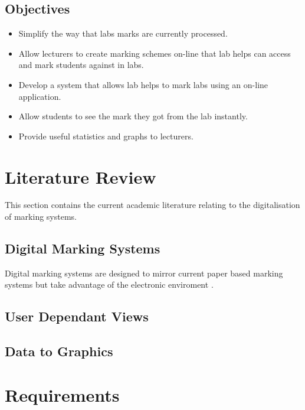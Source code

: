 \documentclass[12pt]{article}  %
\theoremstyle{definition}
\theoremstyle{remark}
\begin{document}
\subsection{Objectives}
\begin{itemize}
\item Simplify the way that labs marks are currently processed.
\item Allow lecturers to create marking schemes on-line that lab helps can access and mark students against in labs.
\item Develop a system that allows lab helps to mark labs using an on-line application.
\item Allow students to see the mark they got from the lab instantly.
\item Provide useful statistics and graphs to lecturers.
\end{itemize}





\newpage
\section{Literature Review}

This section contains the current academic literature relating to the digitalisation of marking systems. 
\subsection{Digital Marking Systems}
Digital marking systems are designed to mirror current paper based marking systems but take advantage of the electronic enviroment \cite{joy_effective_1998}. 

\subsection{User Dependant Views}


\subsection{Data to Graphics}




\newpage
\section{Requirements}
 
\end{document}
